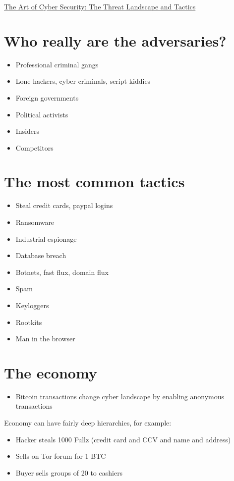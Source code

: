 \documentclass{article}[18pt]
\begin{document}
\begin{center}
\underline{\Large The Art of Cyber Security: The Threat Landscape and Tactics}
\end{center}
\section{Who really are the adversaries?}
\begin{itemize}
	\item Professional criminal gangs
	\item Lone hackers, cyber criminals, script kiddies
	\item Foreign governments
	\item Political activists
	\item Insiders
	\item Competitors
\end{itemize}
\section{The most common tactics}
\begin{itemize}
	\item Steal credit cards, paypal logins
	\item Ransomware
	\item Industrial espionage
	\item Database breach
	\item Botnets, fast flux, domain flux
	\item Spam
	\item Keyloggers
	\item Rootkits
	\item Man in the browser
\end{itemize}
\section{The economy}
\begin{itemize}
	\item Bitcoin transactions change cyber landscape by enabling anonymous transactions
\end{itemize}
Economy can have fairly deep hierarchies, for example:
\begin{itemize}
	\item Hacker steals 1000 Fullz (credit card and CCV and name and address)
	\item Sells on Tor forum for 1 BTC
	\item Buyer sells groups of 20 to cashiers
\end{itemize}
\end{document}
